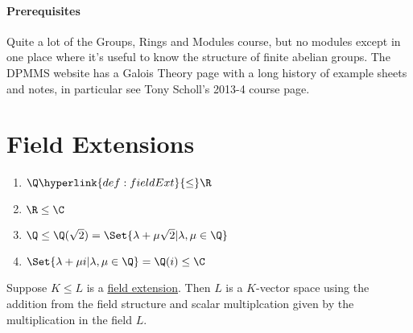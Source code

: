 \documentclass{article}
\begin{document}

\paragraph{Prerequisites} Quite a lot of the Groups, Rings and Modules course, but no modules except in one place where it's useful to know the structure of finite abelian groups.
The DPMMS website has a Galois Theory page with a long history of example sheets and notes, in particular see Tony Scholl's 2013-4 course page.
\clearpage

\section{Field Extensions}\label{sec:1}

\begin{eg}
    \leavevmode
    \begin{enumerate}[label=(\roman*)]
        \item $\Q \hyperlink{def:fieldExt}{\leq} \R$
        \item $\R \leq \C$
        \item $\Q \leq \Q(\sqrt{2}) = \Set{\lambda + \mu \sqrt{2} | \lambda, \mu \in \Q}$
        \item $\Set{\lambda + \mu i | \lambda, \mu \in \Q} = \Q(i) \leq \C$
    \end{enumerate}
\end{eg}

Suppose $K \leq L$ is a \hyperlink{def:fieldExt}{field extension}. Then $L$ is a $K$-vector space using the addition from the field structure and scalar multiplcation given by the multiplication in the field $L$.

\end{document}
